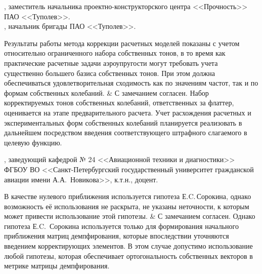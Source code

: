\begin{frame}
	\beginSkip
	, заместитель начальника проектно-конструкторского центра <<Прочность>> ПАО <<Туполев>>. \\
	, начальник бригады ПАО <<Туполев>>. \\
	\begin{comtblr}{15em}
		Результаты работы метода коррекции расчетных моделей показаны с учетом относительно ограниченного набора собственных тонов, в то время как практические расчетные задачи аэроупругости могут требовать учета существенно большего базиса собственных тонов. При этом должна обеспечиваться удовлетворительная сходимость как по значениям частот, так и по формам собственных колебаний.
		&
		С замечанием согласен. Набор корректируемых тонов собственных колебаний, ответственных за флаттер, оценивается на этапе предварительного расчета. Учет расхождения расчетных и экспериментальных форм собственных колебаний планируется реализовать в дальнейшем посредством введения соответствующего штрафного слагаемого в целевую функцию.
	\end{comtblr}
\end{frame}

\begin{frame}
	\beginSkip
	, заведующий кафедрой № 24 <<Авиационной техники и диагностики>> ФГБОУ ВО <<Санкт-Петербургский государственный университет гражданской авиации имени А.А.~Новикова>>, к.т.н., доцент.
	\begin{comtblr}{15em}
		В качестве нулевого приближения используется гипотеза Е.C.\,Сорокина, однако возможность её использования не раскрыта, не указаны неточности, к которым может привести использование этой гипотезы.
		&
		С замечанием согласен. Однако гипотеза Е.C.~Сорокина используется только для формирования начального приближения матриц демпфирования, которые впоследствии уточняются введением корректирующих элементов. В этом случае допустимо использование любой гипотезы, которая обеспечивает ортогональность собственных векторов в метрике матрицы демпфирования. 
	\end{comtblr}
\end{frame}

